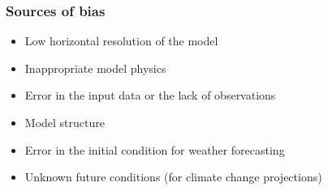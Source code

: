 \documentclass[11pt]{article}
\begin{document}
\subsubsection{Sources of bias}
\label{sec:orge528598}
\begin{itemize}
\item Low horizontal resolution of the model
\item Inappropriate model physics
\item Error in the input data or the lack of observations
\item Model structure
\item Error in the initial condition for weather forecasting
\item Unknown future conditions (for climate change projections)
\end{itemize}
\end{document}
